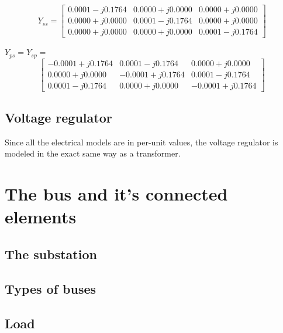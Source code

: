 \documentclass{tufte-book}
\begin{document}
$$
Y_{ss} =\left[ \begin{array}{ccc}
0.0001 - j0.1764 & 0.0000 + j0.0000 & 0.0000 + j0.0000\\
0.0000 + j0.0000 & 0.0001 - j0.1764 & 0.0000 + j0.0000\\
0.0000 + j0.0000 & 0.0000 + j0.0000 & 0.0001 - j0.1764
\end{array} \right]
$$



$Y_{ps} = Y_{sp} =$
$$
\left[ \begin{array}{ccc}
-0.0001 + j0.1764 & 0.0001 - j0.1764 & 0.0000 + j0.0000\\
0.0000 + j0.0000 & -0.0001 + j0.1764 & 0.0001 - j0.1764\\
0.0001 - j0.1764 & 0.0000 + j0.0000 & -0.0001 + j0.1764
\end{array} \right]
$$





\section{Voltage regulator}

Since all the electrical models are in per-unit values, the voltage regulator is modeled in the exact same way as a transformer.




\chapter{The bus and it's connected elements}


\section{The substation}



\section{Types of buses}


\section{Load}
\end{document}
